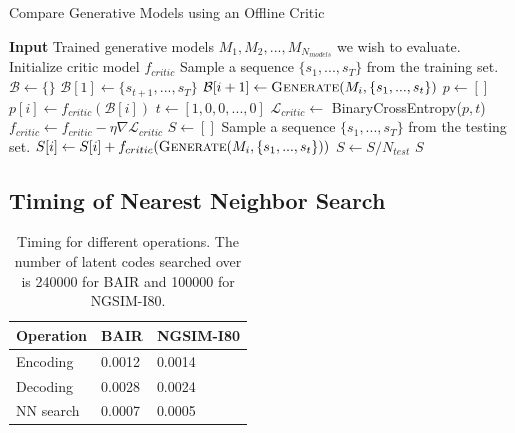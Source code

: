 \documentclass{article}
\begin{document}
\begin{algorithm}[h]
  \caption{Compare Generative Models using an Offline Critic}\label{algo-critic}
  \begin{algorithmic}[1]
    \State \textbf{Input} Trained generative models $M_1, M_2, ..., M_{N_{models}}$ we wish to evaluate.
    \State Initialize critic model $f_{critic}$
    \State Sample a sequence $\{s_1, ..., s_T\}$ from the training set.
    \State $\mathcal{B} \gets \{\}$ 
    \State $\mathcal{B}[1] \gets \{s_{t+1}, ..., s_T\}$ 
    \State $\mathcal{B}[i+1] \gets \textsc{Generate}(M_i, \{s_1, ..., s_t\})$ 
    \EndFor
    \State $p \gets [ ]$
    \State $p[i] \gets f_{critic}(\mathcal{B}[i])$ 
    \EndFor
    \State $t \gets [1, 0, 0, ..., 0]$ 
    \State $\mathcal{L}_{critic} \gets $ BinaryCrossEntropy($p, t$)
    \State $f_{critic} \gets f_{critic} - \eta \nabla{\mathcal{L}_{critic}}$
    \EndFor
    \State $S\gets []$ 
    \State Sample a sequence $\{s_1, ..., s_T\}$ from the testing set.
     
    \State $S[i] \gets S[i] + f_{critic}(\textsc{Generate}(M_i, \{s_1, ..., s_t\}))$
    \EndFor
    \State $S \gets S / N_{test}$
    \EndFor
    \Return $S$ 
  \end{algorithmic}
\end{algorithm}



\subsection{Timing of Nearest Neighbor Search}


\begin{table}
  \caption{Timing for different operations. The number of latent codes searched over is 240000 for BAIR and 100000 for NGSIM-I80. }
  \label{nn-search-timing}
  \centering
  \begin{tabular}{lll}
    \toprule
    Operation     & BAIR & NGSIM-I80 \\
    \midrule
    Encoding & 0.0012 & 0.0014  \\
    Decoding  & 0.0028   & 0.0024 \\
    NN search & 0.0007 & 0.0005      \\
    \bottomrule
  \end{tabular}
\end{table}
\end{document}
